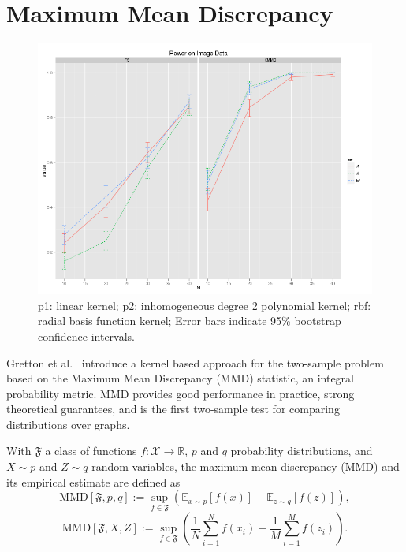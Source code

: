 \section{Maximum Mean Discrepancy}
\begin{figure}
  \centering
  \includegraphics[width=\linewidth]{power_image.png}
  \caption{p1: linear kernel; p2: inhomogeneous degree 2 polynomial
    kernel; rbf: radial basis function kernel; Error bars indicate
    95\% bootstrap confidence intervals.}
  \label{fig:power_image}
\end{figure}

Gretton et al.\ \cite{gretton19m, gretton2010fast, gretton2012kernel,
  borgwardt2006integrating} introduce a kernel based approach for
the two-sample problem based on the Maximum Mean Discrepancy (MMD)
statistic, an integral probability metric.  MMD provides good
performance in practice, strong theoretical guarantees, and is the
first two-sample test for comparing distributions over graphs.

\begin{definition}
  With $\mathfrak{F}$ a class of functions $f:\mathcal{X} \to
  \mathbb{R}$, $p$ and $q$ probability distributions, and $X \sim p$
  and $Z \sim q$ random variables, the maximum mean discrepancy (MMD)
  and its empirical estimate are defined as 
  \begin{equation*}
    \text{MMD}[\mathfrak{F},p,q] := \sup_{f\in
      \mathfrak{F}}(\mathbb{E}_{x\sim p}[f(x)] - \mathbb{E}_{z\sim q}[f(z)]),
  \end{equation*}
  \begin{equation*}
    \text{MMD}[\mathfrak{F},X,Z] := \sup_{f\in
      \mathfrak{F}}\left (\frac{1}{N}\sum_{i=1}^Nf(x_i) -
    \frac{1}{M}\sum_{i=1}^M f(z_i) \right ).
  \end{equation*}
\end{definition}

